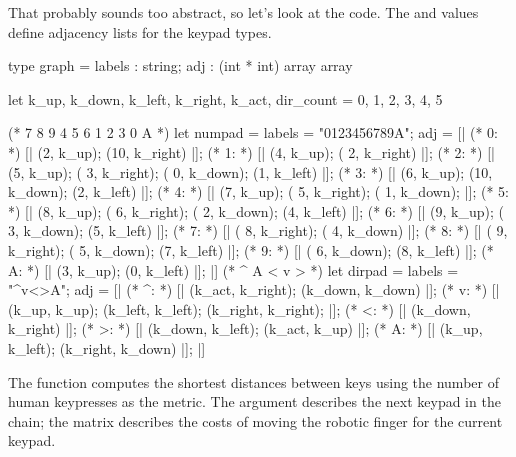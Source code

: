 \documentclass{article}
\begin{document}
That probably sounds too abstract, so let's look at the code.
The  and  values define adjacency lists for the keypad types.

\begin{code}[ocaml]
type graph = { labels : string; adj : (int * int) array array }

let k_up, k_down, k_left, k_right, k_act, dir_count = 0, 1, 2, 3, 4, 5

(* 7 8 9
   4 5 6
   1 2 3
   0 A
 *)
let numpad =
  { labels = "0123456789A";
    adj = [|
            (* 0: *) [| (2, k_up); (10, k_right) |];
            (* 1: *) [| (4, k_up); ( 2, k_right) |];
            (* 2: *) [| (5, k_up); ( 3, k_right); ( 0, k_down); (1, k_left) |];
            (* 3: *) [| (6, k_up);                (10, k_down); (2, k_left) |];
            (* 4: *) [| (7, k_up); ( 5, k_right); ( 1, k_down); |];
            (* 5: *) [| (8, k_up); ( 6, k_right); ( 2, k_down); (4, k_left) |];
            (* 6: *) [| (9, k_up);                ( 3, k_down); (5, k_left) |];
            (* 7: *) [|            ( 8, k_right); ( 4, k_down) |];
            (* 8: *) [|            ( 9, k_right); ( 5, k_down); (7, k_left) |];
            (* 9: *) [|                           ( 6, k_down); (8, k_left) |];
            (* A: *) [| (3, k_up);                              (0, k_left) |];
          |]
  }
(*   ^ A
     < v >
 *)
let dirpad =
  { labels = "^v<>A";
    adj = [|
            (* ^: *) [| (k_act, k_right); (k_down, k_down) |];
            (* v: *) [| (k_up, k_up); (k_left, k_left); (k_right, k_right); |];
            (* <: *) [| (k_down, k_right) |];
            (* >: *) [| (k_down, k_left); (k_act, k_up) |];
            (* A: *) [| (k_up, k_left); (k_right, k_down) |];
          |]
  }
\end{code}

The  function computes the shortest distances between keys using the number of human keypresses as the metric.
The  argument describes the next keypad in the chain; the  matrix describes the costs of moving the robotic finger for the current keypad.
\end{document}

